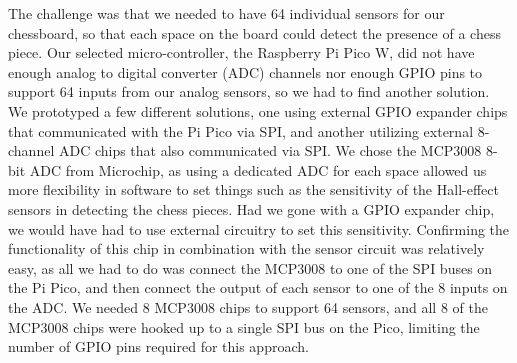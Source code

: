 \documentclass[11pt,journal]{IEEEtran}
\begin{document}
The challenge was that we needed to have 64 individual sensors for our chessboard, so that each space on the board could detect the presence of a chess piece. Our selected micro-controller, the Raspberry Pi Pico W, did not have enough analog to digital converter (ADC) channels nor enough GPIO pins to support 64 inputs from our analog sensors, so we had to find another solution. We prototyped a few different solutions, one using external GPIO expander chips that communicated with the Pi Pico via SPI, and another utilizing external 8-channel ADC chips that also communicated via SPI. We chose the MCP3008 8-bit ADC from Microchip, as using a dedicated ADC for each space allowed us more flexibility in software to set things such as the sensitivity of the Hall-effect sensors in detecting the chess pieces. Had we gone with a GPIO expander chip, we would have had to use external circuitry to set this sensitivity. Confirming the functionality of this chip in combination with the sensor circuit was relatively easy, as all we had to do was connect the MCP3008 to one of the SPI buses on the Pi Pico, and then connect the output of each sensor to one of the 8 inputs on the ADC. We needed 8 MCP3008 chips to support 64 sensors, and all 8 of the MCP3008 chips were hooked up to a single SPI bus on the Pico, limiting the number of GPIO pins required for this approach.
\end{document}
